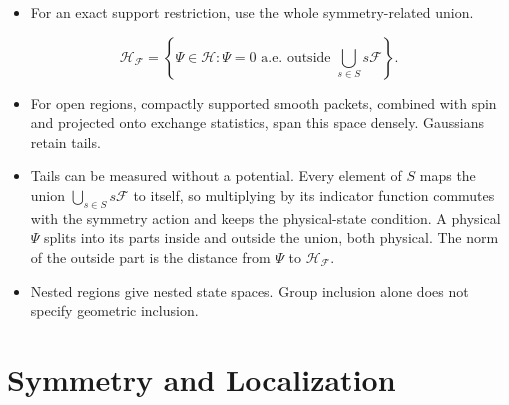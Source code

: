 \documentclass[11pt]{article}
\newcommand{\hilb}{\mathcal{H}}
\begin{document}
\begin{itemize}
\item For an exact support restriction, use the whole symmetry-related union.
\end{itemize}
\[
\hilb_{\mathcal F}
=\left\{\Psi\in\hilb:
\Psi=0\text{ a.e.\ outside }\bigcup_{s\in S}s\mathcal F\right\}.
\]
\begin{itemize}
\item For open regions, compactly supported smooth packets, combined
with spin and projected onto exchange statistics, span this space densely.
Gaussians retain tails.
\item Tails can be measured without a potential. Every element of $S$ maps the union
$\bigcup_{s\in S}s\mathcal F$ to itself, so multiplying by its indicator function commutes with the
symmetry action and keeps the physical-state condition. A physical $\Psi$ splits into its parts inside and
outside the union, both physical. The norm of the outside part is the distance from $\Psi$ to
$\hilb_{\mathcal F}$.
\item Nested regions give nested state spaces. Group inclusion alone
does not specify geometric inclusion.
\end{itemize}

\section{Symmetry and Localization}
\end{document}
